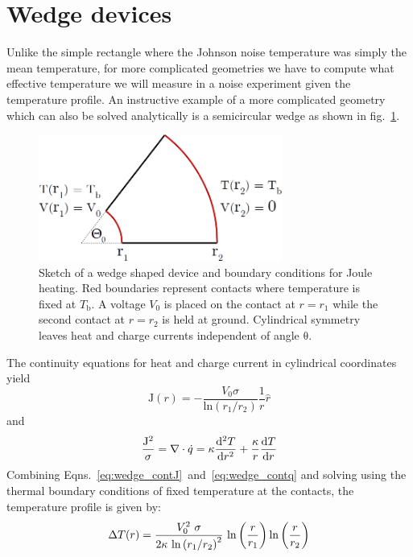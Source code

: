 \section{Wedge devices}
Unlike the simple rectangle where the Johnson noise temperature was simply  the mean temperature, for more complicated geometries we have to compute what effective temperature we will measure in a noise experiment given the temperature profile. An instructive example of a more complicated geometry which can also be solved analytically is a semicircular wedge as shown in fig.~\ref{fig:KCwedge}.
\begin{figure}
\centering
\includegraphics[width=80mm]{figures/thermal_via_noise/wedge.png}
\caption{Sketch of a wedge shaped device and boundary conditions for Joule heating. Red boundaries represent contacts where temperature is fixed at $T_\mathrm{b}$. A voltage $V_0$ is placed on the contact at $r=r_1$ while the second contact at $r=r_2$ is held at ground. Cylindrical symmetry leaves heat and charge currents independent of angle $\mathrm{\theta}$.}
\label{fig:KCwedge}
\end{figure}
The continuity equations for heat and charge current in cylindrical coordinates yield
\begin{equation}\label{eq:wedge_contJ}
\mathrm{J}(r) = -\frac{V_0\sigma}{\mathrm{ln}(r_1/r_2)}\frac{1}{r}\hat{r}
\end{equation}
and
\begin{equation}\label{eq:wedge_contq}
\frac{\mathrm{J}^2}{\sigma} = \nabla\cdot\dot{q} = \mathrm{\kappa}\frac{\mathrm{d}^2 T}{\mathrm{d}r^2}+\frac{\mathrm{\kappa}}{r}\frac{\mathrm{d} T}{\mathrm{d}r}
\end{equation}
Combining Eqns.~\ref{eq:wedge_contJ}~and~\ref{eq:wedge_contq} and solving using the thermal boundary conditions of fixed temperature at the contacts, the temperature profile is given by:
\begin{equation}\label{eq:wedge_Tprofile}
\Delta T(r) = \frac{V_0^2~\sigma}{2\mathrm{\kappa}~\mathrm{ln}\left(r_1/r_2\right)^2}~\mathrm{ln}\left(\frac{r}{r_1}\right)\mathrm{ln}\left(\frac{r}{r_2}\right)
\end{equation}
